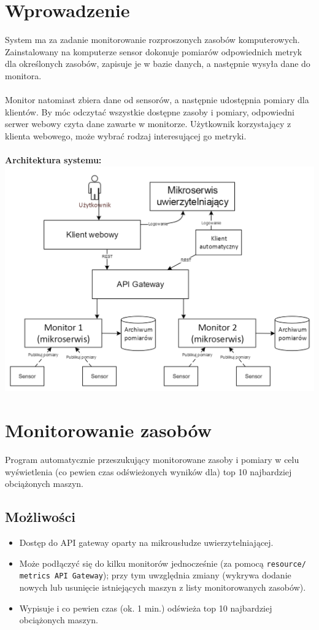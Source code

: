 \documentclass{article}
\begin{document}
\section{Wprowadzenie}
System ma za zadanie monitorowanie rozproszonych zasobów komputerowych. Zainstalowany na komputerze sensor dokonuje pomiarów odpowiednich metryk dla określonych zasobów, zapisuje je w bazie danych, a następnie wysyła dane do monitora.\\\\
Monitor natomiast  zbiera dane od sensorów, a następnie udostępnia pomiary dla klientów. By móc odczytać wszystkie dostępne zasoby i pomiary, odpowiedni serwer webowy czyta dane zawarte w monitorze. Użytkownik korzystający z klienta webowego, może wybrać rodzaj interesującej go metryki.\\\\
\textbf{Architektura systemu:}\\
\includegraphics[width=\linewidth]{../ArchitekturaSystemu.png}
\newpage
\section{Monitorowanie zasobów}
Program automatycznie przeszukujący monitorowane zasoby i pomiary w celu wyświetlenia (co pewien czas odświeżonych wyników dla) top 10 najbardziej obciążonych maszyn.

\subsection{Możliwości}
\begin{itemize}
\item Dostęp do API gateway oparty na mikrousłudze uwierzytelniającej.
\item Może podłączyć się do kilku monitorów jednocześnie (za pomocą \texttt{resource/ metrics API Gateway}); przy tym uwzględnia zmiany (wykrywa dodanie nowych lub usunięcie istniejących maszyn z listy monitorowanych zasobów).
\item Wypisuje i co pewien czas (ok. 1 min.) odświeża top 10 najbardziej obciążonych maszyn.
\end{itemize}
\end{document}
